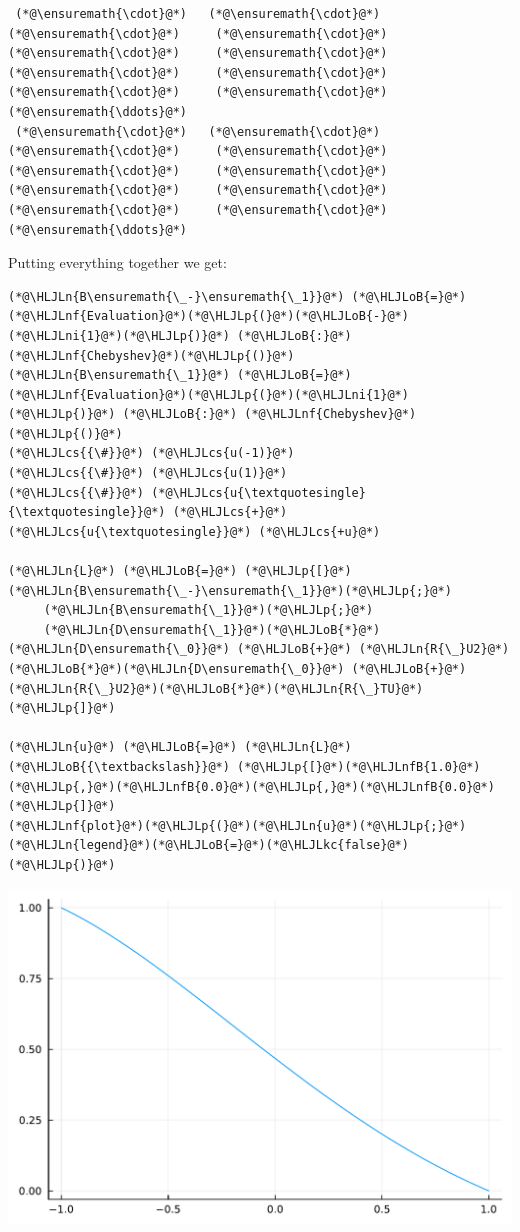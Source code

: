 \documentclass[12pt,a4paper]{article}
\newcommand{\HLJLkc}[1]{\textcolor[RGB]{59,151,46}{\textit{#1}}}
\newcommand{\HLJLn}[1]{#1}
\newcommand{\HLJLnf}[1]{\textcolor[RGB]{66,102,213}{#1}}
\newcommand{\HLJLnfB}[1]{\textcolor[RGB]{59,151,46}{#1}}
\newcommand{\HLJLni}[1]{\textcolor[RGB]{59,151,46}{#1}}
\newcommand{\HLJLoB}[1]{\textcolor[RGB]{102,102,102}{\textbf{#1}}}
\newcommand{\HLJLp}[1]{#1}
\newcommand{\HLJLcs}[1]{\textcolor[RGB]{153,153,119}{\textit{#1}}}
\begin{document}
\begin{lstlisting}
 (*@\ensuremath{\cdot}@*)   (*@\ensuremath{\cdot}@*)    (*@\ensuremath{\cdot}@*)     (*@\ensuremath{\cdot}@*)     (*@\ensuremath{\cdot}@*)     (*@\ensuremath{\cdot}@*)     (*@\ensuremath{\cdot}@*)     (*@\ensuremath{\cdot}@*)     (*@\ensuremath{\cdot}@*)     (*@\ensuremath{\cdot}@*)   (*@\ensuremath{\ddots}@*)
 (*@\ensuremath{\cdot}@*)   (*@\ensuremath{\cdot}@*)    (*@\ensuremath{\cdot}@*)     (*@\ensuremath{\cdot}@*)     (*@\ensuremath{\cdot}@*)     (*@\ensuremath{\cdot}@*)     (*@\ensuremath{\cdot}@*)     (*@\ensuremath{\cdot}@*)     (*@\ensuremath{\cdot}@*)     (*@\ensuremath{\cdot}@*)   (*@\ensuremath{\ddots}@*)
\end{lstlisting}


Putting everything together we get:


\begin{lstlisting}
(*@\HLJLn{B\ensuremath{\_-}\ensuremath{\_1}}@*) (*@\HLJLoB{=}@*) (*@\HLJLnf{Evaluation}@*)(*@\HLJLp{(}@*)(*@\HLJLoB{-}@*)(*@\HLJLni{1}@*)(*@\HLJLp{)}@*) (*@\HLJLoB{:}@*) (*@\HLJLnf{Chebyshev}@*)(*@\HLJLp{()}@*)
(*@\HLJLn{B\ensuremath{\_1}}@*) (*@\HLJLoB{=}@*) (*@\HLJLnf{Evaluation}@*)(*@\HLJLp{(}@*)(*@\HLJLni{1}@*)(*@\HLJLp{)}@*) (*@\HLJLoB{:}@*) (*@\HLJLnf{Chebyshev}@*)(*@\HLJLp{()}@*)
(*@\HLJLcs{{\#}}@*) (*@\HLJLcs{u(-1)}@*)
(*@\HLJLcs{{\#}}@*) (*@\HLJLcs{u(1)}@*)
(*@\HLJLcs{{\#}}@*) (*@\HLJLcs{u{\textquotesingle}{\textquotesingle}}@*) (*@\HLJLcs{+}@*) (*@\HLJLcs{u{\textquotesingle}}@*) (*@\HLJLcs{+u}@*)

(*@\HLJLn{L}@*) (*@\HLJLoB{=}@*) (*@\HLJLp{[}@*)(*@\HLJLn{B\ensuremath{\_-}\ensuremath{\_1}}@*)(*@\HLJLp{;}@*)
     (*@\HLJLn{B\ensuremath{\_1}}@*)(*@\HLJLp{;}@*)
     (*@\HLJLn{D\ensuremath{\_1}}@*)(*@\HLJLoB{*}@*)(*@\HLJLn{D\ensuremath{\_0}}@*) (*@\HLJLoB{+}@*) (*@\HLJLn{R{\_}U2}@*)(*@\HLJLoB{*}@*)(*@\HLJLn{D\ensuremath{\_0}}@*) (*@\HLJLoB{+}@*) (*@\HLJLn{R{\_}U2}@*)(*@\HLJLoB{*}@*)(*@\HLJLn{R{\_}TU}@*)(*@\HLJLp{]}@*)

(*@\HLJLn{u}@*) (*@\HLJLoB{=}@*) (*@\HLJLn{L}@*) (*@\HLJLoB{{\textbackslash}}@*) (*@\HLJLp{[}@*)(*@\HLJLnfB{1.0}@*)(*@\HLJLp{,}@*)(*@\HLJLnfB{0.0}@*)(*@\HLJLp{,}@*)(*@\HLJLnfB{0.0}@*)(*@\HLJLp{]}@*)
(*@\HLJLnf{plot}@*)(*@\HLJLp{(}@*)(*@\HLJLn{u}@*)(*@\HLJLp{;}@*)(*@\HLJLn{legend}@*)(*@\HLJLoB{=}@*)(*@\HLJLkc{false}@*)(*@\HLJLp{)}@*)
\end{lstlisting}

\includegraphics[width=\linewidth]{jl_dOthw0/OP_methods_41_1.pdf}
\end{document}
